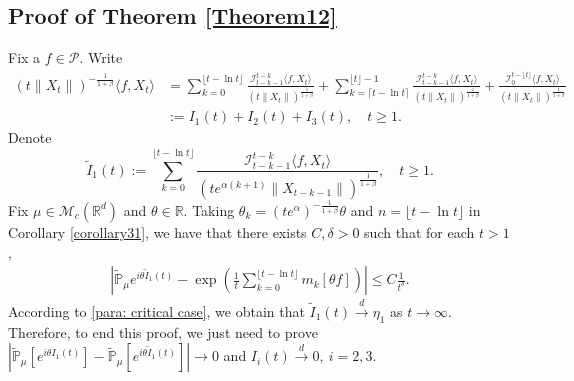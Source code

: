 \documentclass[12pt,oneside,english]{amsart}
\theoremstyle{plain}
\theoremstyle{definition}
\numberwithin{equation}{section}
\begin{document}
\subsection{Proof of Theorem \ref{Theorem12}}

    Fix a $f\in\mathcal{P}$. Write
    \begin{align*}
        (t\|X_t\|)^{-\frac{1}{1+\beta}}\langle f,X_t\rangle
        &=\sum_{k=0}^{\lfloor t-\ln t \rfloor} \frac{\mathcal I_{t-k-1}^{t-k}\langle f ,X_t\rangle}{(t\|X_t\|)^{\frac{1}{1+\beta}}}+\sum_{k=\lceil t-\ln t \rceil}^{\lfloor t \rfloor-1} \frac{\mathcal I_{t-k-1}^{t-k}\langle f ,X_t\rangle}{(t\|X_t\|)^{\frac{1}{1+\beta}}}+\frac{\mathcal I_0^{t-\lfloor t \rfloor}\langle f ,X_t\rangle}{(t\|X_t\|)^{\frac{1}{1+\beta}}}\\
        &:=I_1(t)+I_2(t)+I_3(t), \quad t\geq 1.
    \end{align*}
    Denote
    $$\tilde{I}_1(t):=\sum_{k=0}^{\lfloor t-\ln t \rfloor}\frac{\mathcal I_{t-k-1}^{t-k}\langle f ,X_t\rangle}{(t e^{\alpha(k+1)}\|X_{t-k-1}\|)^{\frac{1}{1+\beta}}}, \quad t\geq 1.$$
    Fix $\mu \in \mathcal M_c(\mathbb R^d)$ and $\theta\in \mathbb{R}$. Taking $\theta_k=(t e^{\alpha})^{-\frac{1}{1+\beta}} \theta $ and $n={\lfloor t-\ln t \rfloor}$ in Corollary \ref{corollary31}, we have that there exists $C,\delta>0$ such that for each $t > 1$,
    \begin{align*}
        \left|\mathbb{\tilde{P}}_{\mu}e^{i\theta\tilde{I}_1(t)}-\exp\left(\frac{1}{t}\sum_{k=0}^{\lfloor t-\ln t \rfloor}m_k[\theta f]\right)\right|\leq C \frac{1}{t^{\delta}}.
    \end{align*}
    According to \eqref{para: critical case}, we obtain that $\tilde{I}_1(t)\xrightarrow{d}\eta_1$ as $t\rightarrow \infty$.
    Therefore, to end this proof, we just need to prove $|\mathbb{\tilde{P}}_{\mu}[e^{i\theta I_1(t)}]-\mathbb{\tilde{P}}_{\mu}[e^{i\theta\tilde{I}_1(t)}]|\rightarrow 0$ and $I_i(t)\xrightarrow{d} 0,~i=2,3$.
\end{document}
